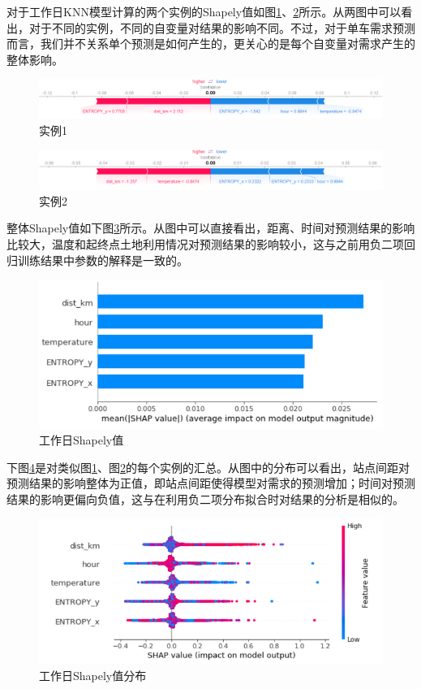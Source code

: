 \documentclass[]{tongjithesis}
\numberwithin{equation}{chapter}
\begin{document}
对于工作日KNN模型计算的两个实例的Shapely值如图\ref{ex1}、\ref{ex2}所示。从两图中可以看出，对于不同的实例，不同的自变量对结果的影响不同。不过，对于单车需求预测而言，我们并不关系单个预测是如何产生的，更关心的是每个自变量对需求产生的整体影响。
\begin{figure}[H]
	\centering
	\includegraphics[width= 0.8 \textwidth]{figures_main/ex_weekday1.png}
	\caption{实例1}
	\label{ex1}
\end{figure}

\begin{figure}[H]
	\centering
	\includegraphics[width= 0.8 \textwidth]{figures_main/ex_weekday2.png}
	\caption{实例2}
	\label{ex2}
\end{figure}

整体Shapely值如下图\ref{weekday_shap1}所示。从图中可以直接看出，距离、时间对预测结果的影响比较大，温度和起终点土地利用情况对预测结果的影响较小，这与之前用负二项回归训练结果中参数的解释是一致的。
\begin{figure}[H]
	\centering
	\includegraphics[width= 0.9 \textwidth]{figures_main/shape_weekday.png}
	\caption{工作日Shapely值}
	\label{weekday_shap1}
\end{figure}

下图\ref{weekday_shap2}是对类似图\ref{ex1}、图\ref{ex2}的每个实例的汇总。从图中的分布可以看出，站点间距对预测结果的影响整体为正值，即站点间距使得模型对需求的预测增加；时间对预测结果的影响更偏向负值，这与在利用负二项分布拟合时对结果的分析是相似的。
\begin{figure}[H]
	\centering
	\includegraphics[width= 0.9 \textwidth]{figures_main/shap1_weekday.png}
	\caption{工作日Shapely值分布}
	\label{weekday_shap2}
\end{figure}
\end{document}
